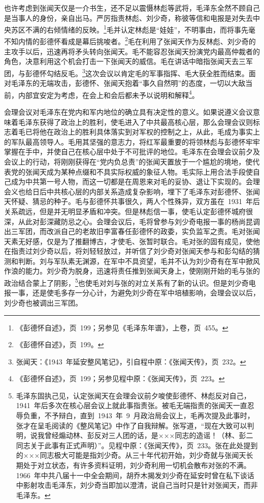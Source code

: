也许考虑到张闻天仅是一介书生，还不足以震慑林彪等武将，毛泽东全然不顾自己是当事人的身份，亲自出马。严厉指责林彪、刘少奇，称彼等信和电报是对失去中央苏区不满的右倾情绪的反映。\footnote{《彭德怀自述》，页~199；另参见《毛泽东年谱》，上卷，页~455。}毛并认定林彪是“娃娃”，不明事由，而将事先毫不知内情的彭德怀看成是幕后挑唆者。\footnote{《彭德怀自述》，页~199。}毛在利用了张闻天作为反林彪、刘少奇的主攻手以后，迅速再将矛头转向张闻天。毛不能容忍张闻天扮演党内最高仲裁者的角色，决意利用这个机会打击一下张闻天的威信。毛在讲话中暗指张闻天去三军团，与彭德怀勾结反毛。\footnote{张闻天：《1943~年延安整风笔记》，引自程中原：《张闻天传》，页~232。}这次会议以肯定毛的军事指挥、毛大获全胜而结束。面对毛泽东的无端攻击，彭德怀、张闻天抱着“事久自然明”的态度，一切以大敌当前，内部宜安定为考虑，在会上和会后都未予以说明和解释\footnote{《彭德怀自述》，页~199；另参见程中原：《张闻天传》，页~223。}。

会理会议对毛泽东在党内和军内地位的确立具有决定性的意义。如果说遵义会议意味着毛泽东获得了政治上的胜利，使毛进入了中共最高核心层，那么会理会议则标志着毛已将他在政治上的胜利具体落实到对军权的控制之上，从此，毛成为事实上的军队最高领导人。毛用其坚强的意志力，将红军最重要的将领林彪与彭德怀牢牢掌握在手中，并使自己在核心层中处于不可批评的地位。毛泽东在会理会议前夕及会议上的行动，将刚刚获得在“党内负总责”的张闻天置放于一个尴尬的境地，使代表党的张闻天成为某种点缀和不具实际权威的象征人物。毛实际上用合法手段使自己成为中共第一号人物，而这一切都是在周恩来对毛的妥协、退让下实现的。会理会义也给日后中共核心层的内部关系造成复杂影响，埋下了毛泽东对彭德怀、张闻天怀疑、猜忌的种子。毛与彭德怀共事很久，两人个性殊异，双方虽在~1931~年后关系疏远，但是并无明显矛盾和冲突。但是林彪信一事，使毛认定彭德怀城府很深，从此对彭深藏防忌之心。会理会议后，毛将曾参与刘少奇电报一事的杨尚昆调出三军团，而改派自己的老故旧李富春任彭德怀的政委，实负监军之责。毛对张闻天素无好感，仅是为了推翻博古，才使毛、张暂时联合。毛对张的固有成见，使他在指责过刘少奇以后，将刘轻轻放过，并听信了刘少奇对张闻天参与和彭勾结的猜测和判断。刘与军队素无渊源，在军中不具资望，毛并不认为刘少奇有在军中掀风作浪的能力。刘少奇为脱身，迅速将责任推到张闻天身上，使刚刚开始的毛与张的政治结合蒙上了阴影，\footnote{毛泽东固执己见，认定张闻天在会理会议前夕唆使彭德怀、林彪反对自己，1941~年后多次在核心层会议上就此事指责张。被毛无端指责的张闻天一直忍辱负重，不予辩白，直到~1943~年~9~月政治局会议上，毛再次提及此事时，张才在呈毛阅读的《整风笔记》中作了自我辩解。张写道，“现在大致可以判明，说我曾经煽动林、彭反对三人团的话，是×××同志的造谣！（林、彭二同志关于此事有正式声明）”。见程中原：《张闻天传》，页~233。张在此处提到的×××同志极大可能是指刘少奇。从三十年代初开始，刘少奇就与张闻天长期处于对立状态，有许多资料证明，刘少奇利用一切机会散布对张的不满。1966~年中共八届十一中全会期间，胡乔木揭发刘少奇在延安时曾在私下谈话中影射攻击毛泽东，刘少奇当即加以澄清，说自己当时只是针对张闻天，而非毛泽东。}也使毛对刘与张的对立关系有了新的认识。但是刘少奇电报一事，还是使毛多存一分心计，为避免刘少奇在军中培植影响，会理会议以后，刘少奇也被调出三军团。

